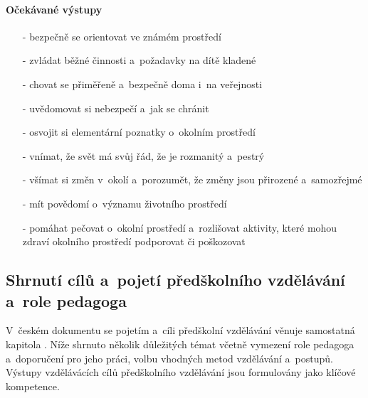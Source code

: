 				\paragraph{Očekávané výstupy}

				\begin{itemize}
				\setlength\itemsep{-2mm}
					\item[-]bezpečně se orientovat ve známém prostředí
					\item[-]zvládat běžné činnosti a~požadavky na dítě kladené
					\item[-]chovat se přiměřeně a~bezpečně doma i~na veřejnosti
					\item[-]uvědomovat si nebezpečí a~jak se chránit
					\item[-]osvojit si elementární poznatky o~okolním prostředí
					\item[-]vnímat, že svět má svůj řád, že je rozmanitý a~pestrý
					\item[-]všímat si změn v~okolí a~porozumět, že změny jsou přirozené a~samozřejmé
					\item[-]mít povědomí o~významu životního prostředí
					\item[-]pomáhat pečovat o~okolní prostředí a~rozlišovat aktivity, které mohou zdraví okolního prostředí podporovat či poškozovat
				\end{itemize}

 			\subsection{Shrnutí cílů a~pojetí předškolního vzdělávání a~role pedagoga}

				V~českém dokumentu se pojetím a~cíli předškolní vzdělávání věnuje samostatná kapitola . Níže shrnuto několik důležitých témat včetně vymezení role pedagoga a~doporučení pro jeho práci, volbu vhodných metod vzdělávání a~postupů. Výstupy vzdělávácích cílů předškolního vzdělávání jsou formulovány jako klíčové kompetence.			


